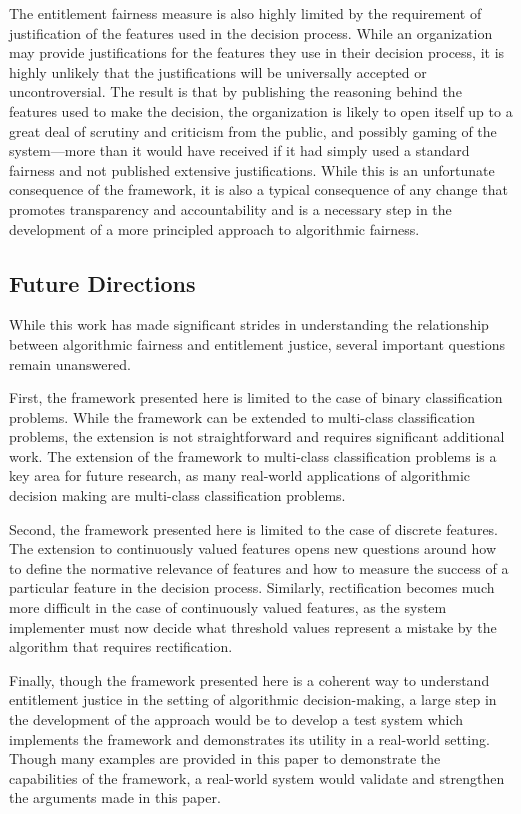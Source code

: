The entitlement fairness measure is also highly limited by the requirement of 
justification of the features used in the decision process. While 
an organization may provide justifications for the features they use in their
decision process, it is highly unlikely that the justifications will be
universally accepted or uncontroversial. The result is that by publishing the 
reasoning behind the features used to make the decision, the organization
is likely to open itself up to a great deal of scrutiny and criticism from the
public, and possibly gaming of the system—more than it would have received if
it had simply used a standard fairness and not published extensive
justifications. While this is an unfortunate consequence of the framework, it
is also a typical consequence of any change that promotes transparency and
accountability and is a necessary step in the development of a more principled
approach to algorithmic fairness.

\subsection{Future Directions}

While this work has made significant strides in understanding the relationship
between algorithmic fairness and entitlement justice, several important
questions remain unanswered. 

First, the framework presented here is limited to the case of binary
classification problems. While the framework can be extended to multi-class
classification problems, the extension is not straightforward and requires
significant additional work. The extension of the framework to multi-class
classification problems is a key area for future research, as many real-world
applications of algorithmic decision making are multi-class classification
problems.

Second, the framework presented here is limited to the case of discrete
features. The extension to continuously valued features opens new questions
around how to define the normative relevance of features and how to measure the 
success of a particular feature in the decision process. Similarly,
rectification becomes much more difficult in the case of continuously valued
features, as the system implementer must now decide what threshold values
represent a mistake by the algorithm that requires rectification.

Finally, though the framework presented here is a coherent way to understand
entitlement justice in the setting of algorithmic decision-making, a large
step in the development of the approach would be to develop a test system which
implements the framework and demonstrates its utility in a real-world setting.
Though many examples are provided in this paper to demonstrate the capabilities
of the framework, a real-world system would validate and strengthen the 
arguments made in this paper.
